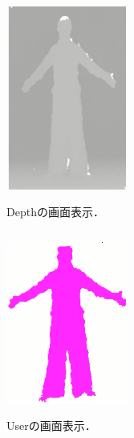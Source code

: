 \begin{figure}[p]
    \begin{minipage}{0.5\hsize}
     \begin{center}
      \includegraphics[width=4cm,height=6cm]{image/Depth.png}
     \end{center}
     \caption[Depthの画面表示]{Depthの画面表示．}
     \label{depth}
    \end{minipage}
    \begin{minipage}{0.5\hsize}
     \begin{center}
      \includegraphics[width=4cm,height=6cm]{image/User.png}
     \end{center}
     \caption[Userの画面表示]{Userの画面表示．}
     \label{user}
    \end{minipage}
\end{figure}

\clearpage

